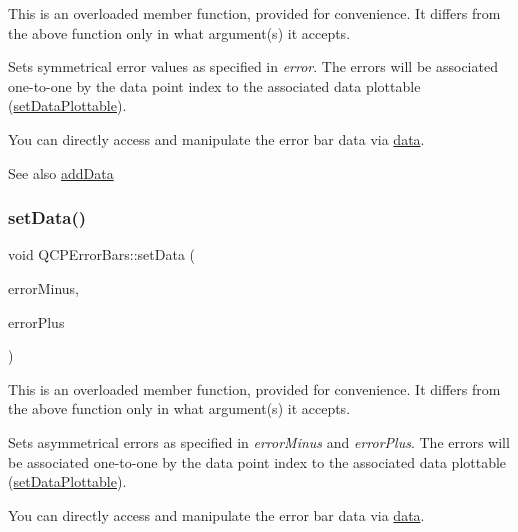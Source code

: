 This is an overloaded member function, provided for convenience. It differs from the above function only in what argument(s) it accepts.

Sets symmetrical error values as specified in {\itshape error}. The errors will be associated one-\/to-\/one by the data point index to the associated data plottable (\hyperlink{class_q_c_p_error_bars_aabb42a964cfbf780cd1c79850c7cd989}{set\+Data\+Plottable}).

You can directly access and manipulate the error bar data via \hyperlink{class_q_c_p_error_bars_aeebd1b14f4c3573565efafd514988813}{data}.

\begin{DoxySeeAlso}{See also}
\hyperlink{class_q_c_p_error_bars_aae296ad9817b3fa418db284af81cecf8}{add\+Data} 
\end{DoxySeeAlso}
\mbox{\label{class_q_c_p_error_bars_aac0cf070b957c11177e91b02bcb433c8}} 
\subsubsection{\texorpdfstring{set\+Data()}{setData()}\hspace{0.1cm}{\footnotesize\ttfamily [3/3]}}
{\footnotesize\ttfamily void Q\+C\+P\+Error\+Bars\+::set\+Data (\begin{DoxyParamCaption}\item[{const \hyperlink{class_q_vector}{Q\+Vector}$<$ double $>$ \&}]{error\+Minus,  }\item[{const \hyperlink{class_q_vector}{Q\+Vector}$<$ double $>$ \&}]{error\+Plus }\end{DoxyParamCaption})}

This is an overloaded member function, provided for convenience. It differs from the above function only in what argument(s) it accepts.

Sets asymmetrical errors as specified in {\itshape error\+Minus} and {\itshape error\+Plus}. The errors will be associated one-\/to-\/one by the data point index to the associated data plottable (\hyperlink{class_q_c_p_error_bars_aabb42a964cfbf780cd1c79850c7cd989}{set\+Data\+Plottable}).

You can directly access and manipulate the error bar data via \hyperlink{class_q_c_p_error_bars_aeebd1b14f4c3573565efafd514988813}{data}.

